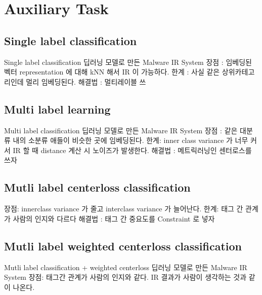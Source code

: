 \section{Auxiliary Task}


\subsection{Single label classification}
Single label classification 딥러닝 모델로 만든 Malware IR System 
장점 : 임베딩된 벡터 representation 에 대해 kNN 해서 IR 이 가능하다.
한계 : 사실 같은 상위카테고리인데 멀리 임베딩된다.
해결법 : 멀티레이블 쓰

\subsection{Multi label learning}
Multi label classification 딥러닝 모델로 만든 Malware IR System 
장점 : 같은 대분류 내의 소분류 애들이 비슷한 곳에 임베딩된다. 
한계: inner class variance 가 너무 커서 IR 할 때 distance 계산 시 노이즈가 발생한다.
해결법 : 메트릭러닝인 센터로스를 쓰자


\subsection{Mutli label centerloss classification}
장점: innerclass variance 가 줄고 interclass variance 가 늘어난다.
한계: 태그 간 관계가 사람의 인지와 다르다
해결법 : 태그 간 중요도를 Constraint 로 넣자

\subsection{Mutli label weighted centerloss classification}
Mutli label classification + weighted centerloss 딥러닝 모델로 만든 Malware IR System 
장점: 태그간 관계가 사람의 인지와 같다. IR 결과가 사람이 생각하는 것과 같이 나온다.


